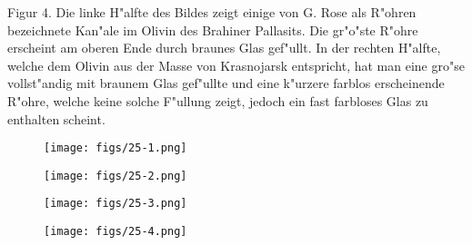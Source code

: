 \documentclass[a4paper, 11pt, oneside, polutonikogreek, german]{article}
\begin{document}
Figur 4. Die linke H"alfte des Bildes zeigt einige von G. Rose als R"ohren bezeichnete Kan"ale im Olivin des Brahiner Pallasits. Die gr"o"ste R"ohre erscheint am oberen Ende durch braunes Glas gef"ullt. In der rechten H"alfte, welche dem Olivin aus der Masse von Krasnojarsk entspricht, hat man eine gro"se vollst"andig mit braunem Glas gef"ullte und eine k"urzere farblos erscheinende R"ohre, welche keine solche F"ullung zeigt, jedoch ein fast farbloses Glas zu enthalten scheint.
\clearpage

\vspace*{\fill}
\begin{figure}[H]
\centering
\texttt{[image: figs/25-1.png]}
\caption{}
\end{figure}
\vspace*{\fill}
\clearpage

\vspace*{\fill}
\begin{figure}[H]
\centering
\texttt{[image: figs/25-2.png]}
\caption{}
\end{figure}
\vspace*{\fill}
\clearpage

\vspace*{\fill}
\begin{figure}[H]
\centering
\texttt{[image: figs/25-3.png]}
\caption{}
\end{figure}
\vspace*{\fill}
\clearpage

\vspace*{\fill}
\begin{figure}[H]
\centering
\texttt{[image: figs/25-4.png]}
\caption{}
\end{figure}
\vspace*{\fill}
\clearpage
\end{document}

